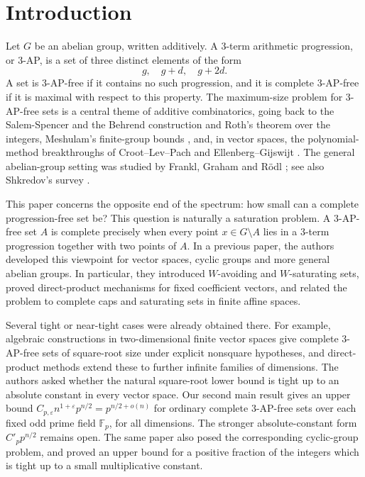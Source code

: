 \documentclass[11pt]{article}
\newcommand{\F}{\mathbb F}
\begin{document}
	\section{Introduction}
	
	Let $G$ be an abelian group, written additively.  A $3$-term arithmetic progression, or $3$-AP, is a set of three distinct elements of the form
	\[
	g,\quad g+d,\quad g+2d .
	\]
	A set is $3$-AP-free if it contains no such progression, and it is complete $3$-AP-free if it is maximal with respect to this property.  The maximum-size problem for $3$-AP-free sets is a central theme of additive combinatorics, going back to the Salem-Spencer and the Behrend construction \cite{Behrend1946, Salem} and Roth's theorem \cite{Roth1953} over the integers, Meshulam's finite-group bounds \cite{Meshulam1995}, and, in vector spaces, the polynomial-method breakthroughs of Croot--Lev--Pach \cite{CLP2017} and Ellenberg--Gijswijt \cite{EG2017}.  The general abelian-group setting was studied by Frankl, Graham and R\"odl \cite{FGR1987}; see also Shkredov's survey \cite{Shkredov2006}.
	
	This paper concerns the opposite end of the spectrum: how small can a complete progression-free set be?  This question is naturally a saturation problem.  A $3$-AP-free set $A$ is complete precisely when every point $x\in G\setminus A$ lies in a $3$-term progression together with two points of $A$.  In a previous paper, the authors \cite{CsajbokNagy2025} developed this viewpoint for vector spaces, cyclic groups and more general abelian groups.  In particular, they introduced $W$-avoiding and $W$-saturating sets, proved direct-product mechanisms for fixed coefficient vectors, and related the problem to complete caps and saturating sets in finite affine spaces.
	
	Several tight or near-tight cases were already obtained there.  For example, algebraic constructions in two-dimensional finite vector spaces give complete $3$-AP-free sets of square-root size under explicit nonsquare hypotheses, and direct-product methods extend these to further infinite families of dimensions. The authors  \cite[Problem~5.1]{CsajbokNagy2025} asked whether the natural square-root lower bound is tight up to an absolute constant in every vector space.  Our second main result gives an upper bound $C_{p, \varepsilon} n^{1+\varepsilon} p^{n/2}=p^{n/2+o(n)}$ for ordinary complete $3$-AP-free sets over each fixed odd prime field $\F_p$, for all dimensions.  The stronger absolute-constant form  $C'_{p}  p^{n/2}$ remains open.  The same paper also posed the corresponding cyclic-group problem, and proved an upper bound for a positive fraction of the integers which is tight up to a small  multiplicative constant.
	
\end{document}

